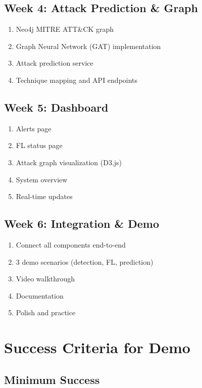\documentclass[11pt,a4paper]{article}
\begin{document}
\subsection{Week 4: Attack Prediction \& Graph}

\begin{enumerate}[leftmargin=*]
    \item Neo4j MITRE ATT\&CK graph
    \item Graph Neural Network (GAT) implementation
    \item Attack prediction service
    \item Technique mapping and API endpoints
\end{enumerate}

\subsection{Week 5: Dashboard}

\begin{enumerate}[leftmargin=*]
    \item Alerts page
    \item FL status page
    \item Attack graph visualization (D3.js)
    \item System overview
    \item Real-time updates
\end{enumerate}

\subsection{Week 6: Integration \& Demo}

\begin{enumerate}[leftmargin=*]
    \item Connect all components end-to-end
    \item 3 demo scenarios (detection, FL, prediction)
    \item Video walkthrough
    \item Documentation
    \item Polish and practice
\end{enumerate}


\section{Success Criteria for Demo}

\subsection{Minimum Success}
\end{document}
